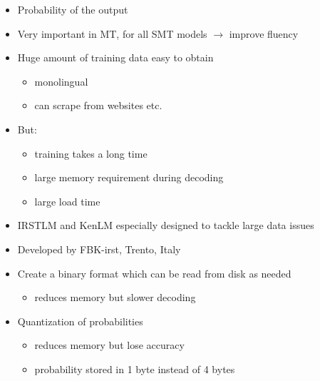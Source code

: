 \documentclass[landscape]{uedslides2C}
\begin{document}
\begin{itemize} \itemsep -1mm
\item Probability of the output 
\item Very important in MT, for all SMT models $\rightarrow$ improve fluency
\item Huge amount of training data easy to obtain
	\begin{itemize}
	\item monolingual
	\item can scrape from websites etc.
	\end{itemize}
\item But:
	\begin{itemize}
	\item training takes a long time
	\item large memory requirement during decoding
	\item large load time
	\end{itemize}
\item IRSTLM and KenLM especially designed to tackle large data issues
\end{itemize}

%
%
%   
%
%  
%  
  
\vspace{20mm}
\begin{itemize}
\item Developed by FBK-irst, Trento, Italy
\item Create a binary format which can be read from disk as needed
	\begin{itemize}
	\item reduces memory but slower decoding 
	\end{itemize}
\item Quantization of probabilities
	\begin{itemize}
	\item reduces memory but lose accuracy
	\item probability stored in 1 byte instead of 4 bytes
	\end{itemize}
\end{itemize}
\end{document}
